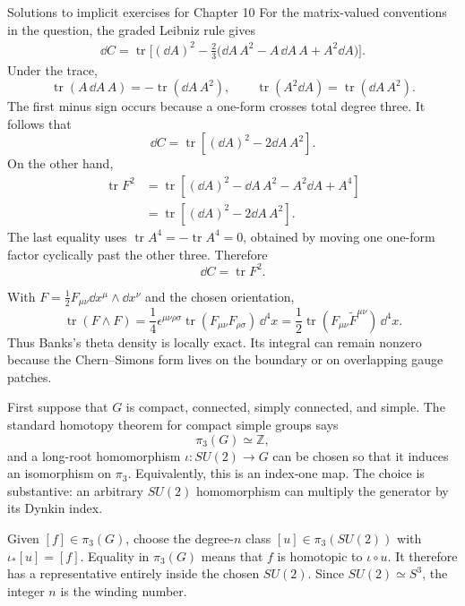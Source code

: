 \begin{bankssolutions}{Solutions to implicit exercises for Chapter 10}
For the matrix-valued conventions in the question, the graded Leibniz rule
gives
\[
\begin{aligned}
  \dd C
  =\operatorname{tr}\bigg[
    (\dd A)^2-\frac23\bigl(
    \dd A\,A^2-A\,\dd A\,A+A^2\dd A\bigr)\bigg].
\end{aligned}
\]
Under the trace,
\[
  \operatorname{tr}(A\,\dd A\,A)
  =-\operatorname{tr}(\dd A\,A^2),
  \qquad
  \operatorname{tr}(A^2\dd A)
  =\operatorname{tr}(\dd A\,A^2).
\]
The first minus sign occurs because a one-form crosses total degree three.
It follows that
\[
  \dd C=\operatorname{tr}\left[(\dd A)^2-2\dd A\,A^2\right].
\]
On the other hand,
\[
\begin{aligned}
  \operatorname{tr}F^2
  &=\operatorname{tr}\left[
    (\dd A)^2-\dd A\,A^2-A^2\dd A+A^4\right]\\
  &=\operatorname{tr}\left[(\dd A)^2-2\dd A\,A^2\right].
\end{aligned}
\]
The last equality uses
$\operatorname{tr}A^4=-\operatorname{tr}A^4=0$, obtained by moving one
one-form factor cyclically past the other three.  Therefore
\[
  \dd C=\operatorname{tr}F^2.
\]

With $F=\tfrac12F_{\mu\nu}\dd x^\mu\wedge\dd x^\nu$ and the chosen
orientation,
\[
  \operatorname{tr}(F\wedge F)
  =\frac14\epsilon^{\mu\nu\rho\sigma}
    \operatorname{tr}(F_{\mu\nu}F_{\rho\sigma})\,\dd^4x
  =\frac12\operatorname{tr}
    (F_{\mu\nu}\widetilde F^{\mu\nu})\,\dd^4x.
\]
Thus Banks's theta density is locally exact.  Its integral can remain nonzero
because the Chern--Simons form lives on the boundary or on overlapping gauge
patches.

First suppose that $G$ is compact, connected, simply connected, and simple.
The standard homotopy theorem for compact simple groups says
\[
  \pi_3(G)\simeq\mathbb Z,
\]
and a long-root homomorphism $\iota:SU(2)\to G$ can be chosen so that it
induces an isomorphism on $\pi_3$.  Equivalently, this is an index-one map.
The choice is substantive: an arbitrary $SU(2)$ homomorphism can multiply the
generator by its Dynkin index.

Given $[f]\in\pi_3(G)$, choose the degree-$n$ class
$[u]\in\pi_3(SU(2))$ with $\iota_*[u]=[f]$.  Equality in $\pi_3(G)$ means
that $f$ is homotopic to $\iota\circ u$.  It therefore has a representative
entirely inside the chosen $SU(2)$.  Since $SU(2)\simeq S^3$, the integer
$n$ is the winding number.


\end{bankssolutions}
